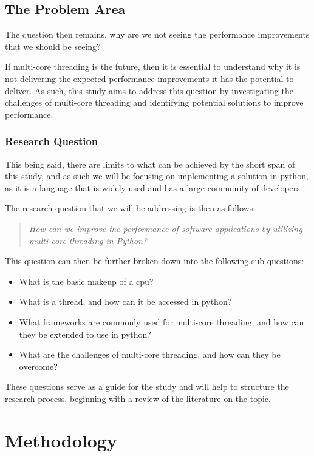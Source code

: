 \documentclass{article}
\begin{document}
\subsection{The Problem Area}

The question then remains, why are we not seeing the performance improvements that we should be seeing?

If multi-core threading is the future, then it is essential to understand why it is not delivering the expected performance improvements it has the potential to deliver. 
As such, this study aims to address this question by investigating the challenges of multi-core threading and identifying potential solutions to improve performance.

\subsubsection{Research Question}

This being said, there are limits to what can be achieved by the short span of this study, and as such we will be focusing on implementing a solution in python, 
as it is a language that is widely used and has a large community of developers.

The research question that we will be addressing is then as follows:

\begin{quote}
    \textit{How can we improve the performance of software applications by utilizing multi-core threading in Python?}
\end{quote}

This question can then be further broken down into the following sub-questions:

\begin{itemize}
    \item What is the basic makeup of a cpu?
    \item What is a thread, and how can it be accessed in python?
    \item What frameworks are commonly used for multi-core threading, and how can they be extended to use in python?
    \item What are the challenges of multi-core threading, and how can they be overcome?
\end{itemize}

These questions serve as a guide for the study and will help to structure the research process, beginning with a review of the literature on the topic.

\section{Methodology}
\end{document}
